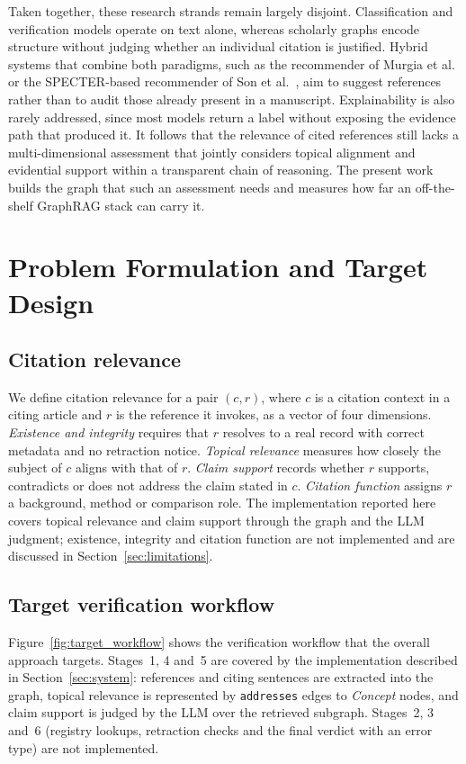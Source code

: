 \documentclass[lettersize,journal]{IEEEtran}
\begin{document}
Taken together, these research strands remain largely disjoint. Classification and verification models operate on text alone, whereas scholarly graphs encode structure without judging whether an individual citation is justified. Hybrid systems that combine both paradigms, such as the recommender of Murgia et al.~\cite{murgia2026citegen} or the SPECTER-based recommender of Son et al.~\cite{son2026specter}, aim to suggest references rather than to audit those already present in a manuscript. Explainability is also rarely addressed, since most models return a label without exposing the evidence path that produced it. It follows that the relevance of cited references still lacks a multi-dimensional assessment that jointly considers topical alignment and evidential support within a transparent chain of reasoning. The present work builds the graph that such an assessment needs and measures how far an off-the-shelf GraphRAG stack can carry it.

\section{Problem Formulation and Target Design}
\label{sec:problem}

\subsection{Citation relevance}

We define citation relevance for a pair $(c, r)$, where $c$ is a citation context in a citing article and $r$ is the reference it invokes, as a vector of four dimensions. \emph{Existence and integrity} requires that $r$ resolves to a real record with correct metadata and no retraction notice. \emph{Topical relevance} measures how closely the subject of $c$ aligns with that of $r$. \emph{Claim support} records whether $r$ supports, contradicts or does not address the claim stated in $c$. \emph{Citation function} assigns $r$ a background, method or comparison role. The implementation reported here covers topical relevance and claim support through the graph and the LLM judgment; existence, integrity and citation function are not implemented and are discussed in Section~\ref{sec:limitations}.

\subsection{Target verification workflow}

Figure~\ref{fig:target_workflow} shows the verification workflow that the overall approach targets. Stages~1, 4 and~5 are covered by the implementation described in Section~\ref{sec:system}: references and citing sentences are extracted into the graph, topical relevance is represented by \texttt{addresses} edges to \emph{Concept} nodes, and claim support is judged by the LLM over the retrieved subgraph. Stages~2, 3 and~6 (registry lookups, retraction checks and the final verdict with an error type) are not implemented.
\end{document}
